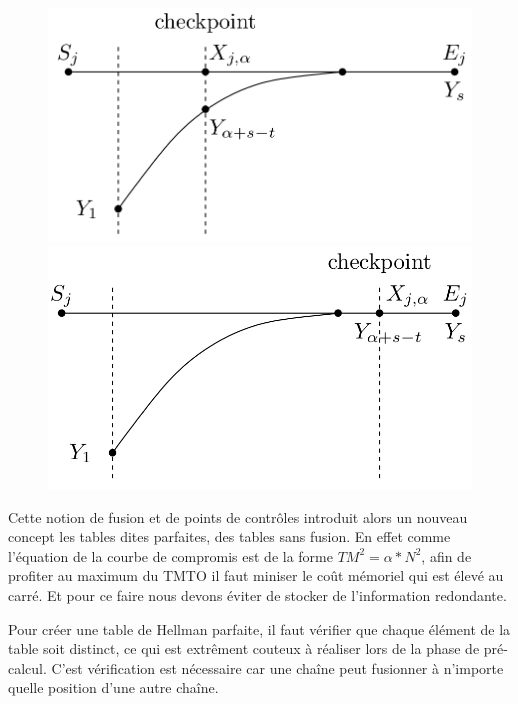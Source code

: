 \begin{figure}[!ht]
	\begin{minipage}{.5\textwidth}
		\includegraphics[width=0.9\linewidth]{other/FalseAlarmDetected.png}
	\end{minipage}
	\begin{minipage}{.5\textwidth}
		\includegraphics[width=0.9\linewidth]{other/FalseAlarmNotDetected.png}
	\end{minipage}
\end{figure}


	Cette notion de fusion et de points de contrôles introduit alors un nouveau concept les tables dites parfaites, des tables sans fusion. En effet comme l'équation de la courbe de compromis est de la forme $TM^2=\alpha *N^2$, afin de profiter au maximum du \gls{TMTO} il faut miniser le coût mémoriel qui est élevé au carré. Et pour ce faire nous devons éviter de stocker de l'information redondante.
	
	\bigskip
	
	Pour créer une table de Hellman parfaite, il faut vérifier que chaque élément de la table soit distinct, ce qui est extrêment couteux à réaliser lors de la phase de pré-calcul. C'est vérification est nécessaire car une chaîne peut fusionner à n'importe quelle position d'une autre chaîne.
	
